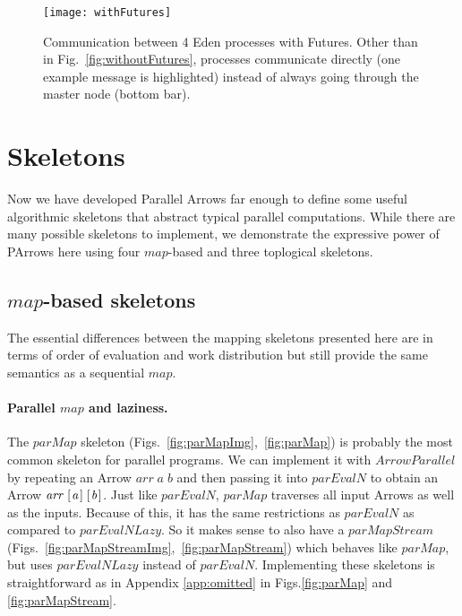 \documentclass{jfp1}
\newcommand{\Conid}[1]{\mathit{#1}}
\newcommand{\Varid}[1]{\mathit{#1}}
\begin{document}
\begin{figure}[ht]
	\centering
	\texttt{[image: withFutures]}
	\caption[with Futures]{Communication between 4 Eden processes with Futures. Other than in Fig.~\ref{fig:withoutFutures}, processes communicate directly (one example message is highlighted) instead of always going through the master node (bottom bar).}
	\label{fig:withFutures}
\end{figure}
	\section{Skeletons}
\label{sec:skeletons}
Now we have developed Parallel Arrows far enough to define some useful algorithmic skeletons that abstract typical parallel computations. While there are many possible skeletons to implement, we demonstrate the expressive power of PArrows here using four \ensuremath{\Varid{map}}-based and three toplogical skeletons.
\subsection{\ensuremath{\Varid{map}}-based skeletons}
\label{sec:map-skeletons}
The essential differences between the mapping skeletons presented here are in terms of order of evaluation and work distribution but still provide the same semantics as a sequential \ensuremath{\Varid{map}}.

\paragraph{Parallel \ensuremath{\Varid{map}} and laziness.}
The \ensuremath{\Varid{parMap}} skeleton (Figs.~\ref{fig:parMapImg},~\ref{fig:parMap}) is probably the most common skeleton for parallel programs. We can implement it with \ensuremath{\Conid{ArrowParallel}} by repeating an Arrow \ensuremath{\Varid{arr}\;\Varid{a}\;\Varid{b}} and then passing it into \ensuremath{\Varid{parEvalN}} to obtain an Arrow \ensuremath{\Varid{arr}\;[\mskip1.5mu \Varid{a}\mskip1.5mu]\;[\mskip1.5mu \Varid{b}\mskip1.5mu]}.
Just like \ensuremath{\Varid{parEvalN}}, \ensuremath{\Varid{parMap}} traverses all input Arrows as well as the inputs.
Because of this, it has the same restrictions as \ensuremath{\Varid{parEvalN}} as compared to \ensuremath{\Varid{parEvalNLazy}}. So it makes sense to also have a \ensuremath{\Varid{parMapStream}} (Figs.~\ref{fig:parMapStreamImg},~\ref{fig:parMapStream}) which behaves like \ensuremath{\Varid{parMap}}, but uses \ensuremath{\Varid{parEvalNLazy}} instead of \ensuremath{\Varid{parEvalN}}. Implementing these skeletons is straightforward as in Appendix \ref{app:omitted} in Figs.\ref{fig:parMap} and \ref{fig:parMapStream}.
\end{document}
